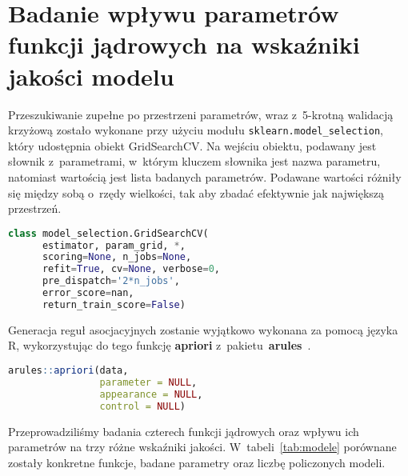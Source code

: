 \section{Badanie wpływu parametrów funkcji jądrowych na wskaźniki jakości modelu}
\label{sec:parametry}

Przeszukiwanie zupełne po przestrzeni parametrów, wraz z~5-krotną walidacją krzyżową zostało wykonane przy użyciu modułu \texttt{sklearn.model\_{}selection}, który udostępnia obiekt GridSearchCV. Na wejściu obiektu, podawany jest słownik z~parametrami, w~którym kluczem słownika jest nazwa parametru, natomiast wartością jest lista badanych parametrów. Podawane wartości różniły się między sobą o~rzędy wielkości, tak aby zbadać efektywnie jak największą przestrzeń.

\begin{lstlisting}[language=Python, captionpos=b, caption=Nagłówek klasy \texttt{GridSearchCV}]
class model_selection.GridSearchCV(
      estimator, param_grid, *, 
      scoring=None, n_jobs=None, 
      refit=True, cv=None, verbose=0, 
      pre_dispatch='2*n_jobs',
      error_score=nan, 
      return_train_score=False)
\end{lstlisting}

Generacja reguł asocjacyjnych zostanie wyjątkowo wykonana za pomocą języka R, wykorzystując do tego funkcję \textbf{apriori} z~pakietu~\textbf{arules}~\cite{arules}.

\begin{lstlisting}[language=R, captionpos=b, caption=Nagłówek funkcji \texttt{apriori}]
arules::apriori(data, 
                parameter = NULL, 
                appearance = NULL, 
                control = NULL)
\end{lstlisting}


Przeprowadziliśmy badania czterech funkcji jądrowych oraz wpływu ich parametrów na trzy różne wskaźniki jakości. W~tabeli~\ref{tab:modele} porównane zostały konkretne funkcje, badane parametry oraz liczbę policzonych modeli.

\begin{table}[htb]
    \centering
    \caption{Porównanie parametrów badanych funkcji jądrowych oraz liczby wyuczonych modeli \label{tab:modele}}
\end{table}

